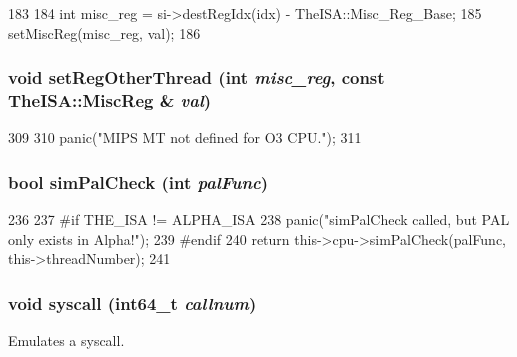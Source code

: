 \begin{DoxyCode}
183     {
184         int misc_reg = si->destRegIdx(idx) - TheISA::Misc_Reg_Base;
185         setMiscReg(misc_reg, val);
186     }
\end{DoxyCode}
\hypertarget{classBaseO3DynInst_af05ac53fdafd8a612ca89f90b0c12910}{
\subsubsection[{setRegOtherThread}]{\setlength{\rightskip}{0pt plus 5cm}void setRegOtherThread (int {\em misc\_\-reg}, \/  const TheISA::MiscReg \& {\em val})}}
\label{classBaseO3DynInst_af05ac53fdafd8a612ca89f90b0c12910}



\begin{DoxyCode}
309     {
310         panic("MIPS MT not defined for O3 CPU.\n");
311     }
\end{DoxyCode}
\hypertarget{classBaseO3DynInst_a461205960be9d52e9beda48a77e9c600}{
\subsubsection[{simPalCheck}]{\setlength{\rightskip}{0pt plus 5cm}bool simPalCheck (int {\em palFunc})}}
\label{classBaseO3DynInst_a461205960be9d52e9beda48a77e9c600}



\begin{DoxyCode}
236 {
237 #if THE_ISA != ALPHA_ISA
238     panic("simPalCheck called, but PAL only exists in Alpha!\n");
239 #endif
240     return this->cpu->simPalCheck(palFunc, this->threadNumber);
241 }
\end{DoxyCode}
\hypertarget{classBaseO3DynInst_a36e0b96120fcbbc2ee8699158f7be5c2}{
\subsubsection[{syscall}]{\setlength{\rightskip}{0pt plus 5cm}void syscall (int64\_\-t {\em callnum})}}
\label{classBaseO3DynInst_a36e0b96120fcbbc2ee8699158f7be5c2}
Emulates a syscall. 


